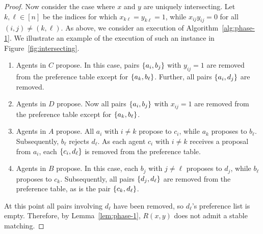 \begin{proof}
    Now consider the case where $x$ and $y$ are uniquely intersecting. Let $k, \ell \in [n]$ be the indices for which $x_{k \ell} = y_{k \ell} = 1$, while $x_{i j} y_{i j} = 0$ for all $(i, j) \neq (k, \ell)$. As above, we consider an execution of Algorithm~\ref{alg:phase-1}. We illustrate an example of the execution of such an instance in Figure~\ref{fig:intersecting}.
    \begin{enumerate}
        \item Agents in $C$ propose. In this case, pairs $\left\{a_i, b_j\right\}$ with $y_{ij} = 1$ are removed from the preference table except for $\left\{a_k, b_\ell\right\}$. Further, all pairs $\left\{a_i, d_j\right\}$ are removed.
        \item Agents in $D$ propose. Now all pairs $\left\{a_i, b_j\right\}$ with $x_{ij} = 1$ are removed from the preference table except for $\left\{a_k, b_\ell\right\}$.
        \item Agents in $A$ propose. All $a_{i}$ with $i \neq k$ propose to $c_i$, while $a_k$ proposes to $b_\ell$. Subsequently, $b_\ell$ rejects $d_\ell$. As each agent $c_i$ with $i \neq k$ receives a proposal from $a_i$, each $\left\{c_i, d_\ell\right\}$ is removed from the preference table.
        \item Agents in $B$ propose. In this case, each $b_j$ with $j \neq \ell$ proposes to $d_j$, while $b_\ell$ proposes to $c_k$. Subsequently, all pairs $\left\{d_j, d_\ell\right\}$ are removed from the preference table, as is the pair $\left\{c_k, d_\ell\right\}$.
    \end{enumerate}
    At this point all pairs involving $d_\ell$ have been removed, so $d_\ell$'s preference list is empty. Therefore, by Lemma~\ref{lem:phase-1}, $R(x, y)$ does not admit a stable matching.
\end{proof}

